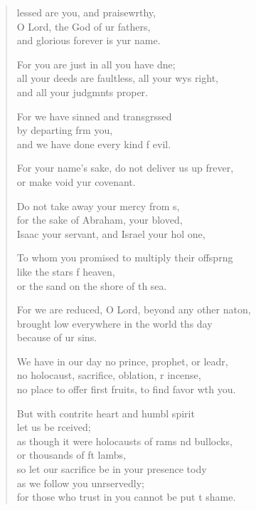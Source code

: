 \begin{verse}
  \begin{patverse}
lessed are you, and praisewrthy,\Flex\\
O Lord, the God of ur fathers,\Med\\
and glorious forever is yur name.

For you are just in all you have dne;\Flex\\
all your deeds are faultless, all your wys right,\Med\\
and all your judgmnts proper.

For we have sinned and transgrssed\Flex\\
by departing frm you,\Med\\
and we have done every kind f evil.

For your name’s sake, do not deliver us up frever,\Med\\
or make void yur covenant.

Do not take away your mercy from s,\Flex\\
for the sake of Abraham, your bloved,\Med\\
Isaac your servant, and Israel your hol one,

To whom you promised to multiply their offspr\pointup{\i}ng\Flex\\
like the stars f heaven,\Med\\
or the sand on the shore of th sea.

For we are reduced, O Lord, beyond any other nat\pointup{\i}on,\Flex\\
brought low everywhere in the world th\pointup{\i}s day\Med\\
because of ur sins.

We have in our day no prince, prophet, or leadr,\Flex\\
no holocaust, sacrifice, oblation, r incense,\Med\\
no place to offer first fruits, to find favor w\pointup{\i}th you.

But with contrite heart and humbl spirit\Med\\
let us be rceived;\\
as though it were holocausts of rams nd bullocks,\Med\\
or thousands of ft lambs,\\
so let our sacrifice be in your presence tody\Flex\\
as we follow you unrservedly;\Med\\
for those who trust in you cannot be put t shame.


\end{patverse}
\end{verse}
